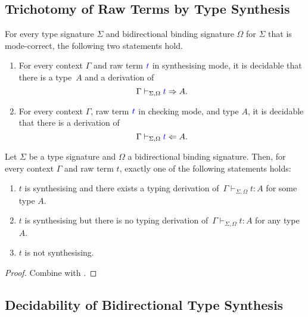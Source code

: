 \documentclass[acmsmall,screen]{acmart}
\theoremstyle{acmdefinition}
\begin{document}
\subsection{Trichotomy of Raw Terms by Type Synthesis}

\begin{theorem} \label{thm:bidirectional-type-synthesis}
  For every type signature $\Sigma$ and bidirectional binding signature $\Omega$ for $\Sigma$ that is mode-correct, the following two statements hold.

  \begin{enumerate}
    \item For every context $\Gamma$ and raw term ${\textcolor{blue}{t}}$ in synthesising mode, it is decidable that there is a type~$A$ and a derivation of
      \[
        \Gamma \vdash_{\Sigma, \Omega} {\textcolor{blue}{t}} \Rightarrow A.
      \]
    \item For every context $\Gamma$, raw term ${\textcolor{blue}{t}}$ in checking mode, and type $A$, it is decidable that there is a derivation of
      \[
        \Gamma \vdash_{\Sigma, \Omega} {\textcolor{blue}{t}} \Leftarrow A.
      \]
  \end{enumerate}
\end{theorem}

\begin{corollary}
  Let $\Sigma$ be a type signature and $\Omega$ a bidirectional binding signature.
  Then, for every context $\Gamma$ and raw term $t$, exactly one of the following statements holds:
  \begin{enumerate}
    \item $t$ is synthesising and there exists a typing derivation of\, $\Gamma \vdash_{\Sigma, \Omega} t : A$ for some type $A$.
    \item $t$ is synthesising but there is no typing derivation of\, $\Gamma \vdash_{\Sigma, \Omega} t : A$ for any type $A$.
    \item $t$ is not synthesising.
  \end{enumerate}
\end{corollary}
\begin{proof}
  Combine   with .
  
\end{proof}



\subsection{Decidability of Bidirectional Type Synthesis}
\end{document}
